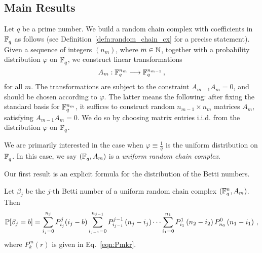 
\subsection*{Main Results}
Let $q$ be a prime number.  We
build a random chain complex with coefficients in $\mathbb{F}_q^{}$ as follows (see
Definition~\ref{defn:random_chain_cx} for a precise statement). Given a
sequence of integers $(n_m)$, where $m \in \mathbb{N}$, together with a probability
distribution $\varphi$ on $\mathbb{F}_q^{}$, we construct 
linear transformations 
\[
  A_m : \mathbb{F}_q^{n_m} \longrightarrow \mathbb{F}_q^{n_{m-1}} \, ,
\]
for all $m$. The transformations are subject to the constraint $A_{m-1} A_m =
0$, and should be chosen according to $\varphi$. The latter means the
following: after fixing the standard basis for $\mathbb{F}_q^{n_m}$, it suffices to
construct random $n_{m-1} \times n_m$ matrices $A_m$, satisfying $A_{m-1}A_m =
0$. We do so by choosing matrix entries i.i.d. from the distribution $\varphi$
on $\mathbb{F}_q^{}$.

We are primarily interested in the case when $\varphi \equiv \tfrac1q$ is
the uniform distribution on $\mathbb{F}_q^{}$. In this case, we say
$(\mathbb{F}_q^{}, A_m)$ is a {\em uniform random chain complex}.


Our first result is an explicit formula for the distribution
of the Betti numbers.
\begin{bigthm} 
  \label{thm:bettinum}
  Let $\beta_j$ be the $j$-th Betti number of a uniform random chain complex
  $(\mathbb{F}_q^{n} , A_m)$. Then
  \[    
    \mathbb{P}[\beta_j = b] = \sum_{i_j=0}^{n_{j}} P_{i_j}^{j}(i_j-b)
    \sum_{i_{j-1}=0}^{n_{j-1}} P_{i_{j-1}}^{j-1}\left(n_{j} -i_j\right) \cdots
    \sum_{i_1 = 0}^{n_1} P_{i_1}^1\left(n_2 - i_2\right) P_{n_0}^0 \left(n_1 - i_1\right) \, ,
  \]
  where $P^m_k(r)$ is given in Eq.~\eqref{eqn:Pmkr}.
\end{bigthm}


